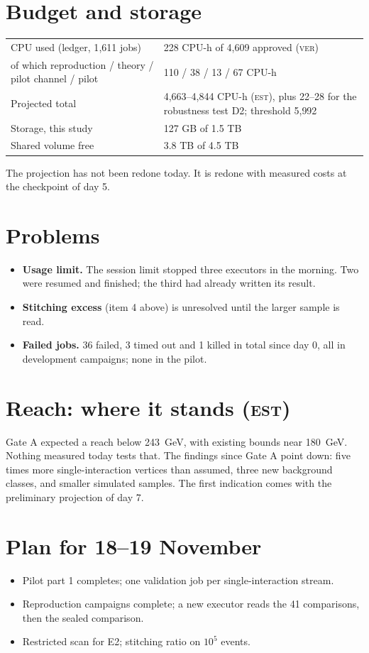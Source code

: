 \documentclass[11pt,a4paper]{article}
\newcommand{\est}{\textsc{est}}
\newcommand{\ver}{\textsc{ver}}
\begin{document}
\section{Budget and storage}
\begin{center}
\begin{tabular}{L{7.6cm}L{6.4cm}}
\toprule
CPU used (ledger, 1{,}611 jobs) & 228 CPU-h of 4{,}609 approved (\ver) \\
\quad of which reproduction / theory / pilot channel / pilot & 110 / 38 / 13 / 67 CPU-h \\
Projected total & 4{,}663--4{,}844 CPU-h (\est), plus 22--28 for the robustness test D2; threshold 5{,}992 \\
Storage, this study & 127 GB of 1.5 TB \\
Shared volume free & 3.8 TB of 4.5 TB \\
\bottomrule
\end{tabular}
\end{center}
The projection has not been redone today. It is redone with measured costs at the checkpoint of day 5.

\section{Problems}
\begin{itemize}
\item \textbf{Usage limit.} The session limit stopped three executors in the morning. Two were resumed and
      finished; the third had already written its result.
\item \textbf{Stitching excess} (item 4 above) is unresolved until the larger sample is read.
\item \textbf{Failed jobs.} 36 failed, 3 timed out and 1 killed in total since day 0, all in development campaigns;
      none in the pilot.
\end{itemize}

\section{Reach: where it stands (\est)}
Gate A expected a reach below 243~GeV, with existing bounds near 180~GeV. Nothing measured today tests that. The
findings since Gate A point down: five times more single-interaction vertices than assumed, three new background
classes, and smaller simulated samples. The first indication comes with the preliminary projection of day 7.

\section{Plan for 18--19 November}
\begin{itemize}
\item Pilot part 1 completes; one validation job per single-interaction stream.
\item Reproduction campaigns complete; a new executor reads the 41 comparisons, then the sealed comparison.
\item Restricted scan for E2; stitching ratio on $10^{5}$ events.
\end{itemize}
\end{document}
